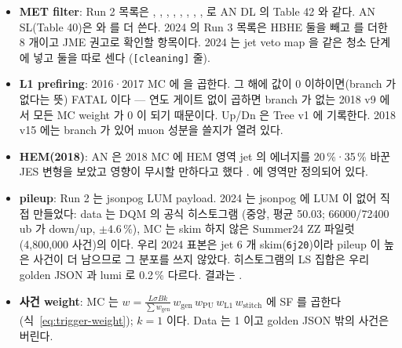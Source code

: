\begin{itemize}
\item \textbf{MET filter}: Run 2 목록은 , , ,
  , , , , ,
   로 AN DL 의 Table 42 와 같다. AN SL(Table 40)은  와  를 더
  쓴다. 2024 의 Run 3 목록은 HBHE 둘을 빼고  를 더한 8 개이고
  JME 권고로 확인할 항목이다\tagrunthree. 2024 는 jet veto map 을 같은 청소 단계에 넣고 둘을 따로 센다
  (\texttt{[cleaning]} 줄).
\item \textbf{L1 prefiring}: 2016·2017 MC 에  을 곱한다. 그 해에 값이 0 이하이면(branch 가 없다는 뜻) FATAL 이다
  --- 연도 게이트 없이 곱하면 branch 가 없는 2018 v9 에서 모든 MC weight 가 0 이 되기 때문이다.
  Up/Dn 은 Tree v1 에 기록한다. 2018 v15 에는 branch 가 있어 muon 성분을 쓸지가 열려 있다\tagopen.
\item \textbf{HEM(2018)}: AN 은 2018 MC 에 HEM 영역 jet 의 에너지를 20\,\%·35\,\% 바꾼 JES 변형을 보았고 영향이 무시할 만하다고 했다
  .  에 영역만 정의되어 있다\tagplan.
\item \textbf{pileup}: Run 2 는 jsonpog LUM payload. 2024 는 jsonpog 에 LUM 이 없어 직접 만들었다: data 는 DQM 의 공식 히스토그램
  (중앙, 평균 50.03; 66000/72400 ub 가 down/up, $\pm4.6\,\%$), MC 는 skim 하지 않은
  Summer24 ZZ 파일럿(4,800,000 사건)의  이다. 우리 2024 표본은 jet 6 개 skim(\texttt{6j20})이라 pileup 이 높은 사건이 더
  남으므로 그 분포를 쓰지 않았다. 히스토그램의 LS 집합은 우리 golden JSON 과 lumi 로 0.2\,\% 다르다. 결과는
  \tagimpl\tagrunthree.
\item \textbf{사건 weight}: MC 는 $w = \frac{L\sigma B k}{\sum w_\text{gen}}\, w_\text{gen}\, w_\text{PU}\, w_\text{L1}\, w_\text{stitch}$ 에 SF 를
  곱한다(식~\eqref{eq:trigger-weight}); $k=1$ 이다. Data 는 1 이고 golden JSON 밖의 사건은 버린다.
\end{itemize}

